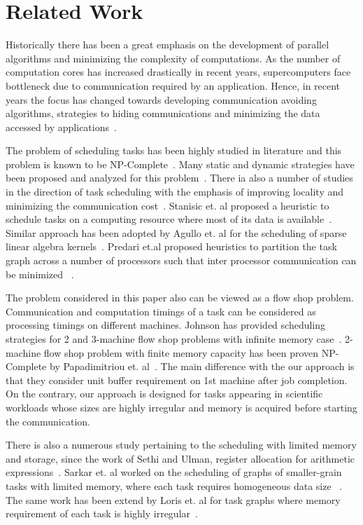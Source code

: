 \documentclass[runningheads]{llncs} %
\begin{document}
\section{Related Work}



Historically there has been a great emphasis on the development of parallel algorithms and minimizing the complexity of computations. As the number of computation cores has increased drastically in recent years, supercomputers face bottleneck due to communication required by an application. Hence, in recent years the focus has changed towards developing communication avoiding algorithms, strategies to hiding communications and  minimizing the data accessed by applications~\cite{yelick2016}. 

  
The problem of scheduling tasks has been highly studied in literature and this problem is known to be NP-Complete~\cite{GareyJohnson}.  Many static and dynamic strategies have been proposed and analyzed for this problem~\cite{heft-Topcuoglu,hipc16multiresource,ipdps16starpu}. There ia also a number of studies in the direction of task scheduling with the emphasis of improving locality and minimizing the communication cost~\cite{starpu,heft-Topcuoglu}. Stanisic et. al proposed a heuristic to schedule tasks on a computing resource where most of its data is available~\cite{luka-dmdar}. Similar approach has been adopted by Agullo et. al for the scheduling of sparse linear algebra kernels~\cite{agullo_fmm}.  Predari et.al  proposed  heuristics to  partition the task graph across a number of processors such that inter processor communication can be minimized ~\cite{predari:tel-01518956}.

The problem considered in this paper also can be viewed as a flow shop problem. Communication and computation timings of a task can be considered as processing timings on different machines.  Johnson has provided scheduling strategies for 2 and 3-machine flow shop problems with infinite memory case~\cite{johnson}. 2-machine flow shop problem with finite memory capacity has been proven NP-Complete by Papadimitriou et. al~\cite{Papadimitriou:1980:FSL:322203.322213}. The main difference with the our approach is that they consider unit buffer requirement on 1st machine after job completion. On the contrary, our approach is designed for tasks appearing in scientific workloads whose sizes are highly irregular and memory is acquired before starting the communication.

There is also a numerous study pertaining to the scheduling with limited memory and storage, since the work of Sethi and Ulman, register allocation for arithmetic expressions~\cite{Sethi:1970:GOC:321607.321620}.  Sarkar et. al  worked on the scheduling of graphs of smaller-grain tasks with limited memory, where each task requires homogeneous data size ~\cite{vsarkar-pact}. The same work has been extend by Loris et. al for task graphs where memory requirement of each task is highly irregular~\cite{loris-ipdps18}.
\end{document}
